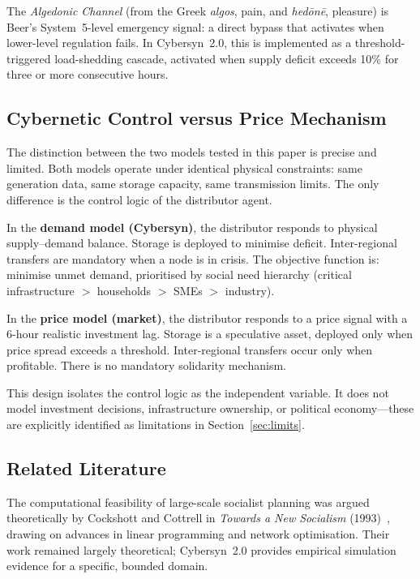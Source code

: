 \documentclass[12pt]{article}
\begin{document}
The \emph{Algedonic Channel} (from the Greek \textit{algos}, pain, and
\textit{hed\={o}n\={e}}, pleasure) is Beer's System~5-level emergency signal: a
direct bypass that activates when lower-level regulation fails.
In Cybersyn~2.0, this is implemented as a threshold-triggered load-shedding cascade,
activated when supply deficit exceeds 10\% for three or more consecutive hours.

\subsection{Cybernetic Control versus Price Mechanism}

The distinction between the two models tested in this paper is precise and limited.
Both models operate under identical physical constraints: same generation data, same
storage capacity, same transmission limits.
The only difference is the control logic of the distributor agent.

In the \textbf{demand model (Cybersyn)}, the distributor responds to physical
supply--demand balance.
Storage is deployed to minimise deficit.
Inter-regional transfers are mandatory when a node is in crisis.
The objective function is: minimise unmet demand, prioritised by social need hierarchy
(critical infrastructure $>$ households $>$ SMEs $>$ industry).

In the \textbf{price model (market)}, the distributor responds to a price signal with
a 6-hour realistic investment lag.
Storage is a speculative asset, deployed only when price spread exceeds a threshold.
Inter-regional transfers occur only when profitable.
There is no mandatory solidarity mechanism.

This design isolates the control logic as the independent variable.
It does not model investment decisions, infrastructure ownership, or political
economy---these are explicitly identified as limitations in Section~\ref{sec:limits}.

\subsection{Related Literature}

The computational feasibility of large-scale socialist planning was argued
theoretically by Cockshott and Cottrell in \emph{Towards a New Socialism}
(1993)~\citep{cockshott1993socialism}, drawing on advances in linear programming and
network optimisation.
Their work remained largely theoretical; Cybersyn~2.0 provides empirical simulation
evidence for a specific, bounded domain.
\end{document}
